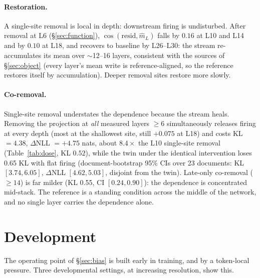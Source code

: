 \documentclass[11pt]{article}
\newcommand{\mhat}{\hat{m}}
\begin{document}
\paragraph{Restoration.} A single-site removal is local in depth:
downstream firing is undisturbed. After removal at L6
(\S\ref{sec:function}), $\cos(\text{resid}, \mhat_L)$ falls by $0.16$ at
L10 and L14 and by $0.10$ at L18, and recovers to baseline by L26--L30: the
stream re-accumulates its mean over $\sim$12--16 layers, consistent with
the sources of \S\ref{sec:object} (every layer's mean write is
reference-aligned, so the reference restores itself by accumulation).
Deeper removal sites restore more slowly.

\paragraph{Co-removal.} Single-site removal understates the
dependence because the stream heals. Removing the projection at
\emph{all} measured layers $\geq 6$ simultaneously releases firing at
every depth (most at the shallowest site, still $+0.075$ at L18) and costs
KL $= 4.38$, $\Delta$NLL $= +4.75$ nats, about $8.4\times$ the
L10 single-site removal (Table~\ref{tab:dose}, KL $0.52$), while the
twin under the identical intervention
loses 0.65 KL with flat firing (document-bootstrap 95\% CIs over 23
documents: KL $[3.74,6.05]$, $\Delta$NLL $[4.62,5.03]$, disjoint from
the twin). Late-only co-removal ($\geq 14$) is far milder (KL 0.55,
CI $[0.24,0.90]$): the dependence is concentrated mid-stack. The
reference is a standing condition across the middle of the network, and
no single layer carries the dependence alone.

\section{Development}
\label{sec:formation}

The operating point of \S\ref{sec:bias} is built early in training, and
by a token-local pressure. Three developmental settings, at increasing
resolution, show this.
\end{document}
